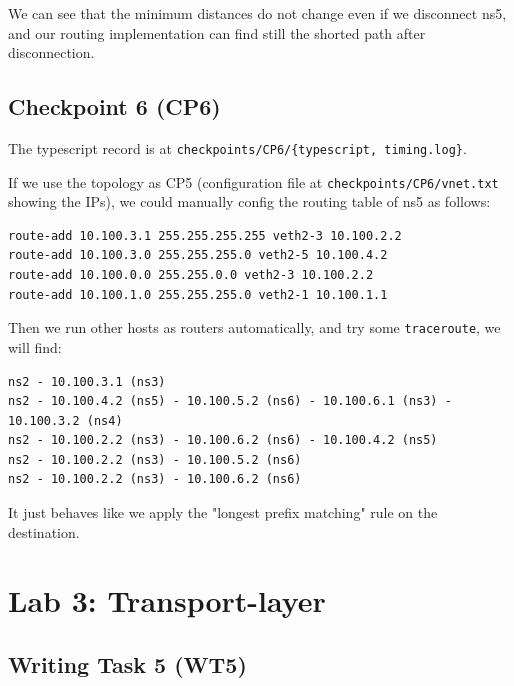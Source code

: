 \documentclass[a4paper]{article}
\begin{document}
  We can see that the minimum distances do not change even if we disconnect ns5, and our routing implementation can find still the shorted path after disconnection.

  \subsection{Checkpoint 6 (CP6)}

  The typescript record is at \texttt{checkpoints/CP6/\{typescript, timing.log\}}.

  If we use the topology as CP5 (configuration file at \texttt{checkpoints/CP6/vnet.txt} showing the IPs), we could manually config the routing table of ns5 as follows:
  \begin{verbatim}
route-add 10.100.3.1 255.255.255.255 veth2-3 10.100.2.2
route-add 10.100.3.0 255.255.255.0 veth2-5 10.100.4.2
route-add 10.100.0.0 255.255.0.0 veth2-3 10.100.2.2
route-add 10.100.1.0 255.255.255.0 veth2-1 10.100.1.1
  \end{verbatim}

  Then we run other hosts as routers automatically, and try some \texttt{traceroute}, we will find:
  \begin{verbatim}
ns2 - 10.100.3.1 (ns3)
ns2 - 10.100.4.2 (ns5) - 10.100.5.2 (ns6) - 10.100.6.1 (ns3) - 10.100.3.2 (ns4)
ns2 - 10.100.2.2 (ns3) - 10.100.6.2 (ns6) - 10.100.4.2 (ns5)
ns2 - 10.100.2.2 (ns3) - 10.100.5.2 (ns6)
ns2 - 10.100.2.2 (ns3) - 10.100.6.2 (ns6)
  \end{verbatim}
  It just behaves like we apply the "longest prefix matching" rule on the destination.


  \section{Lab 3: Transport-layer}

  \subsection{Writing Task 5 (WT5)}
\end{document}
